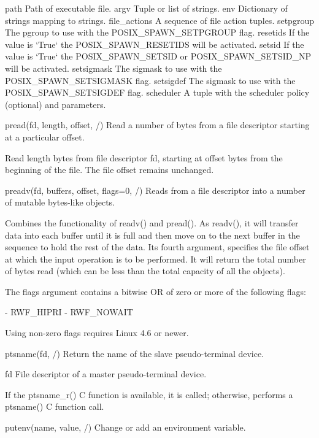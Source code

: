 \documentclass{article}
\begin{document}
        path
          Path of executable file.
        argv
          Tuple or list of strings.
        env
          Dictionary of strings mapping to strings.
        file_actions
          A sequence of file action tuples.
        setpgroup
          The pgroup to use with the POSIX_SPAWN_SETPGROUP flag.
        resetids
          If the value is `True` the POSIX_SPAWN_RESETIDS will be activated.
        setsid
          If the value is `True` the POSIX_SPAWN_SETSID or POSIX_SPAWN_SETSID_NP will be activated.
        setsigmask
          The sigmask to use with the POSIX_SPAWN_SETSIGMASK flag.
        setsigdef
          The sigmask to use with the POSIX_SPAWN_SETSIGDEF flag.
        scheduler
          A tuple with the scheduler policy (optional) and parameters.

    pread(fd, length, offset, /)
        Read a number of bytes from a file descriptor starting at a particular offset.

        Read length bytes from file descriptor fd, starting at offset bytes from
        the beginning of the file.  The file offset remains unchanged.

    preadv(fd, buffers, offset, flags=0, /)
        Reads from a file descriptor into a number of mutable bytes-like objects.

        Combines the functionality of readv() and pread(). As readv(), it will
        transfer data into each buffer until it is full and then move on to the next
        buffer in the sequence to hold the rest of the data. Its fourth argument,
        specifies the file offset at which the input operation is to be performed. It
        will return the total number of bytes read (which can be less than the total
        capacity of all the objects).

        The flags argument contains a bitwise OR of zero or more of the following flags:

        - RWF_HIPRI
        - RWF_NOWAIT

        Using non-zero flags requires Linux 4.6 or newer.

    ptsname(fd, /)
        Return the name of the slave pseudo-terminal device.

          fd
            File descriptor of a master pseudo-terminal device.

        If the ptsname_r() C function is available, it is called;
        otherwise, performs a ptsname() C function call.

    putenv(name, value, /)
        Change or add an environment variable.
\end{document}
